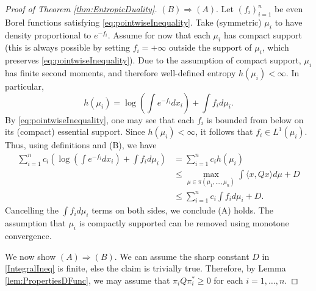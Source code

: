\documentclass[10pt,a4paper]{amsart}
\begin{document}
\begin{proof}[Proof of Theorem \ref{thm:EntropicDuality}]
$(B) \Rightarrow (A)$. Let $(f_i)_{i=1}^n$ be even Borel functions satisfying \eqref{eq:pointwiseInequality}.  Take  (symmetric) $\mu_i$ to have density proportional to $e^{-{f_i}} $. Assume for now that each $\mu_i$ has compact support (this is always possible by setting $f_i = +\infty$ outside the support of $\mu_i$, which preserves \eqref{eq:pointwiseInequality}).  Due to the assumption of compact support, $\mu_i$ has finite second moments, and therefore well-defined entropy $h(\mu_i) < \infty$.    In particular, 
$$
h(\mu_i) =   \log \left( \int e^{-f_i} d x_i \right)  + \int  f_i d\mu_i.
$$
By \eqref{eq:pointwiseInequality}, one may see that each $f_i$ is bounded from below on its (compact) essential support.  Since $h(\mu_i)<\infty$,   it follows that $f_i  \in L^1(\mu_i)$. 
 Thus, using definitions and (B), we have 
\begin{align*}
\sum_{i=1}^n c_i \left( \log \left( \int e^{-f_i} d x_i \right)  + \int  f_i d\mu_i  \right)&=  \sum_{i=1}^n c_i h(\mu_i) \\
&\leq  \max_{\mu \in \pi(\mu_1, \dots, \mu_n)} \int \langle x, Q x\rangle d\mu  +D\\
&\leq   \sum_{i=1}^nc_i \int f_i  d\mu_i  +D.
\end{align*}
Cancelling the $\int f_i  d\mu_i$ terms on both sides, we conclude (A) holds.  The assumption that $\mu_i$ is compactly supported can be removed using monotone convergence.

 

We now show $(A) \Rightarrow (B)$.    We can assume the sharp constant $D$ in \eqref{IntegralIneq} is finite, else the claim is trivially true.  Therefore, by Lemma \ref{lem:PropertiesDFunc}, we may assume that $\pi_i Q \pi_i^* \geq 0$ for each $i=1,\dots, n$.  


\end{proof}
\end{document}
